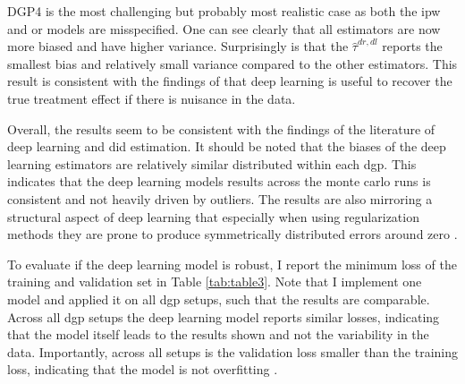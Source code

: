 DGP4 is the most challenging but probably most realistic case as both the \ac{ipw} and \ac{or} models are misspecified.
One can see clearly that all estimators are now more biased and have higher variance.
Surprisingly is that the $\hat{\tau}^{dr,dl}$ reports the smallest bias and relatively small variance compared to the other estimators.
This result is consistent with the findings of \citet{belloni2017program,chernozhukovDoubleDebiasedMachine2018,farrellDeepNeuralNetworks2021} that deep learning is useful to recover the true treatment effect if there is nuisance in the data.

Overall, the results seem to be consistent with the findings of the literature of deep learning and \ac{did} estimation.
It should be noted that the biases of the deep learning estimators are relatively similar distributed within each \ac{dgp}.
This indicates that the deep learning models results across the monte carlo runs is consistent and not heavily driven by outliers.
The results are also mirroring a structural aspect of deep learning that especially when using regularization methods they are prone to produce symmetrically distributed errors around zero \citep{koh2017understanding}.

To evaluate if the deep learning model is robust, I report the minimum loss of the training and validation set in Table \ref{tab:table3}.
Note that I implement one model and applied it on all \ac{dgp} setups, such that the results are comparable.
Across all \ac{dgp} setups the deep learning model reports similar losses, indicating that the model itself leads to the results shown and not the variability in the data.
Importantly, across all setups is the validation loss smaller than the training loss, indicating that the model is not overfitting \citep[see][]{Goodfellow-et-al-2016,farrellDeepNeuralNetworks2021}.





